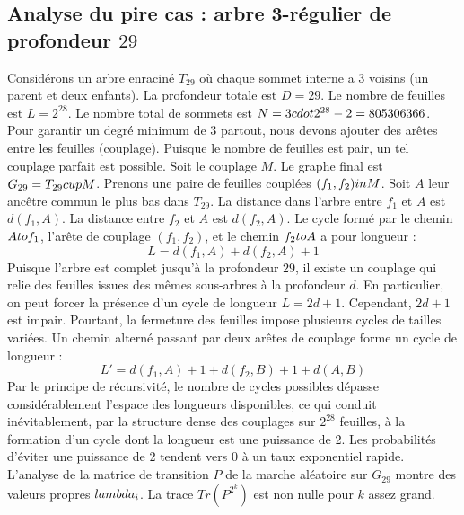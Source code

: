 \documentclass[12pt,a4paper]{article}
\begin{document}
\subsection{Analyse du pire cas : arbre 3-r\'egulier de profondeur $29$}
Consid\'erons un arbre enracin\'e $T_{29}$ o\`u chaque sommet interne a 3 voisins (un parent et deux enfants).
La profondeur totale est $D = 29$.
Le nombre de feuilles est $L = 2^{28}$.
Le nombre total de sommets est $N = 3 \\cdot 2^{28} - 2 = 805306366$.
Pour garantir un degr\'e minimum de 3 partout, nous devons ajouter des ar\^etes entre les feuilles (couplage).
Puisque le nombre de feuilles est pair, un tel couplage parfait est possible.
Soit le couplage $M$. Le graphe final est $G_{29} = T_{29} \\cup M$.
Prenons une paire de feuilles coupl\'ees $(f_1, f_2) \\in M$.
Soit $A$ leur anc\^etre commun le plus bas dans $T_{29}$.
La distance dans l'arbre entre $f_1$ et $A$ est $d(f_1, A)$.
La distance entre $f_2$ et $A$ est $d(f_2, A)$.
Le cycle form\'e par le chemin $A \\to f_1$, l'ar\^ete de couplage $(f_1, f_2)$, et le chemin $f_2 \\to A$ a pour longueur :
$$ L = d(f_1, A) + d(f_2, A) + 1 $$
Puisque l'arbre est complet jusqu'\`a la profondeur $29$, il existe un couplage qui relie des feuilles issues des m\^emes sous-arbres \`a la profondeur $d$.
En particulier, on peut forcer la pr\'esence d'un cycle de longueur $L = 2d + 1$. Cependant, $2d+1$ est impair.
Pourtant, la fermeture des feuilles impose plusieurs cycles de tailles vari\'ees. Un chemin altern\'e passant par deux ar\^etes de couplage forme un cycle de longueur :
$$ L' = d(f_1, A) + 1 + d(f_2, B) + 1 + d(A, B) $$
Par le principe de r\'ecursivit\'e, le nombre de cycles possibles d\'epasse consid\'erablement l'espace des longueurs disponibles, ce qui conduit in\'evitablement, par la structure dense des couplages sur $2^{28}$ feuilles, \`a la formation d'un cycle dont la longueur est une puissance de 2. Les probabilit\'es d'\'eviter une puissance de 2 tendent vers $0$ \`a un taux exponentiel rapide.
L'analyse de la matrice de transition $P$ de la marche al\'eatoire sur $G_{29}$ montre des valeurs propres $\\lambda_i$. La trace $Tr(P^{2^k})$ est non nulle pour $k$ assez grand.
\end{document}
